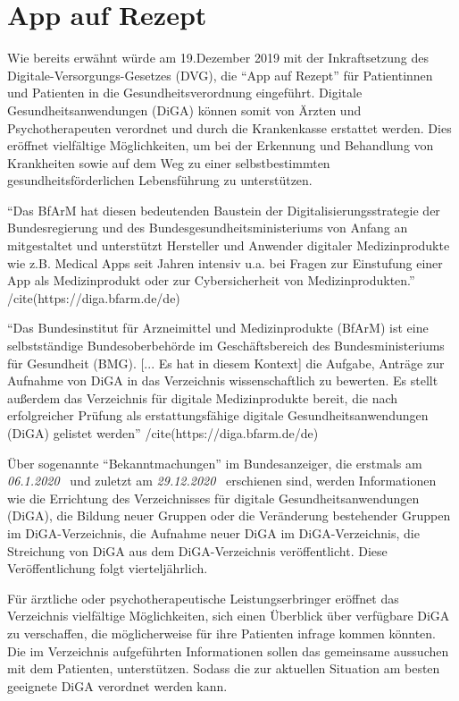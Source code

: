 
\section{App auf Rezept}
Wie bereits erwähnt würde am 19.Dezember 2019 mit der Inkraftsetzung des Digitale-Versorgungs-Gesetzes (DVG), die ``App auf Rezept'' für Patientinnen und Patienten in die Gesundheitsverordnung eingeführt. Digitale Gesundheitsanwendungen (DiGA) können somit von Ärzten und Psychotherapeuten verordnet und durch die Krankenkasse erstattet werden. Dies eröffnet vielfältige Möglichkeiten, um bei der Erkennung und Behandlung von Krankheiten sowie auf dem Weg zu einer selbstbestimmten gesundheitsförderlichen Lebensführung zu unterstützen.

``Das BfArM hat diesen bedeutenden Baustein der Digitalisierungsstrategie der Bundesregierung und des Bundesgesundheitsministeriums von Anfang an mitgestaltet und unterstützt Hersteller und Anwender digitaler Medizinprodukte wie z.B. Medical Apps seit Jahren intensiv u.a. bei Fragen zur Einstufung einer App als Medizinprodukt oder zur Cybersicherheit von Medizinprodukten.'' /cite(https://diga.bfarm.de/de)

``Das Bundesinstitut für Arzneimittel und Medizinprodukte (BfArM) ist eine selbstständige Bundesoberbehörde im Geschäftsbereich des Bundesministeriums für Gesundheit (BMG). [... Es hat in diesem Kontext] die Aufgabe, Anträge zur Aufnahme von DiGA in das Verzeichnis wissenschaftlich zu bewerten. Es stellt außerdem das Verzeichnis für digitale Medizinprodukte bereit, die nach erfolgreicher Prüfung als erstattungsfähige digitale Gesundheitsanwendungen (DiGA) gelistet werden'' /cite(https://diga.bfarm.de/de)

Über sogenannte ``Bekanntmachungen'' im Bundesanzeiger, die erstmals am \textit{06.1.2020}~\cite{https://diga.bfarm.de/assets/documents/201006_BfArM_Bekanntmachung-DiGA-1.pdf} und zuletzt am \textit{29.12.2020}~\cite{https://diga.bfarm.de/assets/documents/201229_BfArM_Bekanntmachung-DiGA-2.pdf} erschienen sind, werden Informationen wie die Errichtung des Verzeichnisses für digitale Gesundheitsanwendungen (DiGA), die Bildung neuer Gruppen oder die Veränderung bestehender Gruppen im DiGA-Verzeichnis, die Aufnahme neuer DiGA im DiGA-Verzeichnis, die Streichung von DiGA aus dem DiGA-Verzeichnis veröffentlicht. Diese Veröffentlichung folgt vierteljährlich.

Für ärztliche oder psychotherapeutische Leistungserbringer eröffnet das Verzeichnis vielfältige Möglichkeiten, sich einen Überblick über verfügbare DiGA zu verschaffen, die möglicherweise für ihre Patienten infrage kommen könnten. Die im Verzeichnis aufgeführten Informationen sollen das gemeinsame aussuchen mit dem Patienten, unterstützen. Sodass die zur aktuellen Situation am besten geeignete DiGA verordnet werden kann.

